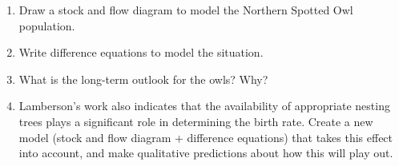 \begin{enumerate}
\item Draw a stock and flow diagram to model the Northern Spotted Owl population.

\item Write difference equations to model the situation.

\item What is the long-term outlook for the owls? Why?

\item Lamberson's work also indicates that the availability of appropriate nesting trees plays a significant role in determining the birth rate.  Create a new model (stock and flow diagram + difference equations) that takes this effect into account,  and make qualitative predictions about how this will play out.
\end{enumerate}


\clearpage


